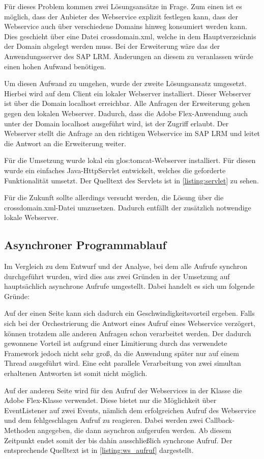 \begin{onehalfspacing}
Für dieses Problem kommen zwei Lösungsansätze in Frage. Zum einen ist es möglich, dass der Anbieter des Webservice explizit festlegen kann, dass der Webservice auch über verschiedene Domains hinweg konsumiert werden kann. Dies geschieht über eine Datei crossdomain.xml, welche in dem Hauptverzeichnis der Domain abgelegt werden muss. Bei der Erweiterung wäre das der Anwendungsserver des SAP LRM. Änderungen an diesem zu veranlassen würde einen hohen Aufwand benötigen. 

Um diesen Aufwand zu umgehen, wurde der zweite Lösungsansatz umgesetzt. Hierbei wird auf dem Client ein lokaler Webserver installiert. Dieser Webserver ist über die Domain localhost erreichbar. Alle Anfragen der Erweiterung gehen gegen den lokalen Webserver. Dadurch, dass die Adobe Flex-Anwendung auch unter der Domain localhost ausgeführt wird, ist der Zugriff erlaubt. Der Webserver stellt die Anfrage an den richtigen Webservice im SAP LRM und leitet die Antwort an die Erweiterung weiter.

Für die Umsetzung wurde lokal ein \gls{glos:tomcat}-Webserver installiert. Für diesen wurde ein einfaches Java-HttpServlet entwickelt, welches die geforderte Funktionalität umsetzt. Der Quelltext des Servlets ist in \vref{listing:servlet} zu sehen.

Für die Zukunft sollte allerdings versucht werden, die Lösung über die crossdomain.xml-Datei umzusetzen. Dadurch entfällt der zusätzlich notwendige lokale Webserver.

\subsection{Asynchroner Programmablauf}
\label{sec:asynchron}
Im Vergleich zu dem Entwurf und der Analyse, bei dem alle Aufrufe synchron durchgeführt wurden, wird dies aus zwei Gründen in der Umsetzung auf hauptsächlich asynchrone Aufrufe umgestellt. Dabei handelt es sich um folgende Gründe:

Auf der einen Seite kann sich dadurch ein Geschwindigkeitsvorteil ergeben. Falls sich bei der Orchestrierung die Antwort eines Aufruf eines Webservice verzögert, können trotzdem alle anderen Anfragen schon verarbeitet werden. Der dadurch gewonnene Vorteil ist aufgrund  einer Limitierung durch das verwendete Framework jedoch nicht sehr groß, da die Anwendung später nur auf einem Thread ausgeführt wird. Eine echt parallele Verarbeitung von zwei simultan erhaltenen Antworten ist somit nicht möglich.

Auf der anderen Seite wird für den Aufruf der Webservices in der Klasse  die Adobe Flex-Klasse  verwendet. Diese bietet nur die Möglichkeit über EventListener auf zwei Events, nämlich dem erfolgreichen Aufruf des Webservice und dem fehlgeschlagen Aufruf zu reagieren. Dabei werden zwei Callback-Methoden angegeben, die dann asynchron aufgerufen werden. Ab diesem Zeitpunkt endet somit der bis dahin ausschließlich synchrone Aufruf. Der entsprechende Quelltext ist in \vref{listing:ws_aufruf} dargestellt.


\end{onehalfspacing}

